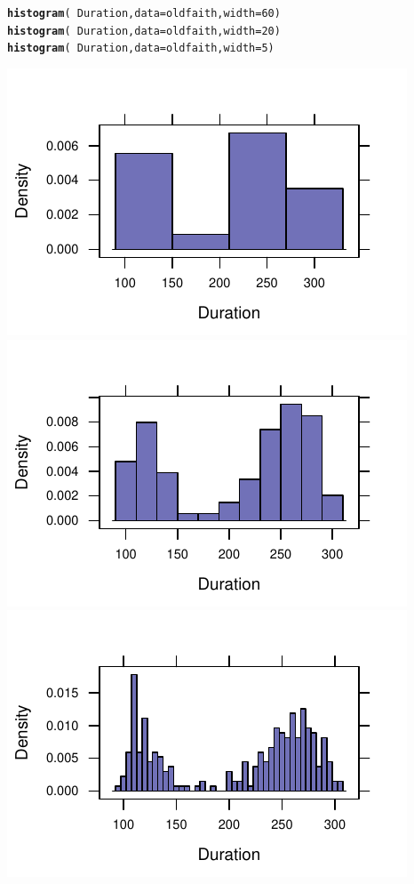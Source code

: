 \documentclass[twoside]{book}\usepackage[]{graphicx}\usepackage[]{xcolor}
\makeatletter
\newcommand{\hlnum}[1]{\textcolor[rgb]{0.686,0.059,0.569}{#1}}%
\newcommand{\hlopt}[1]{\textcolor[rgb]{0,0,0}{#1}}%
\newcommand{\hlstd}[1]{\textcolor[rgb]{0.345,0.345,0.345}{#1}}%
\newcommand{\hlkwc}[1]{\textcolor[rgb]{0.333,0.667,0.333}{#1}}%
\newcommand{\hlkwd}[1]{\textcolor[rgb]{0.737,0.353,0.396}{\textbf{#1}}}%
\newenvironment{kframe}{%
 \def\at@end@of@kframe{}%
 \ifinner\ifhmode%
  \def\at@end@of@kframe{\end{minipage}}%
  \begin{minipage}{\columnwidth}%
 \fi\fi%
 \def\FrameCommand##1{\hskip\@totalleftmargin \hskip-\fboxsep
 \colorbox{shadecolor}{##1}\hskip-\fboxsep
     \hskip-\linewidth \hskip-\@totalleftmargin \hskip\columnwidth}%
 \MakeFramed {\advance\hsize-\width
   \@totalleftmargin\z@ \linewidth\hsize
   \@setminipage}}%
 {\par\unskip\endMakeFramed%
 \at@end@of@kframe}
\newenvironment{knitrout}{}{} %
\makeatother
\begin{document}
\begin{knitrout}
\color{fgcolor}\begin{kframe}
\begin{alltt}
\hlkwd{histogram}\hlstd{(} \hlopt{~} \hlstd{Duration,} \hlkwc{data}\hlstd{=oldfaith,} \hlkwc{width}\hlstd{=}\hlnum{60} \hlstd{)}
\hlkwd{histogram}\hlstd{(} \hlopt{~} \hlstd{Duration,} \hlkwc{data}\hlstd{=oldfaith,} \hlkwc{width}\hlstd{=}\hlnum{20} \hlstd{)}
\hlkwd{histogram}\hlstd{(} \hlopt{~} \hlstd{Duration,} \hlkwc{data}\hlstd{=oldfaith,} \hlkwc{width}\hlstd{=}\hlnum{5} \hlstd{)}
\end{alltt}
\end{kframe}

{\centering \includegraphics[width=.3\textwidth]{figures/fig-xhistogram-1} 
\includegraphics[width=.3\textwidth]{figures/fig-xhistogram-2} 
\includegraphics[width=.3\textwidth]{figures/fig-xhistogram-3} 

}



\end{knitrout}
\end{document}
